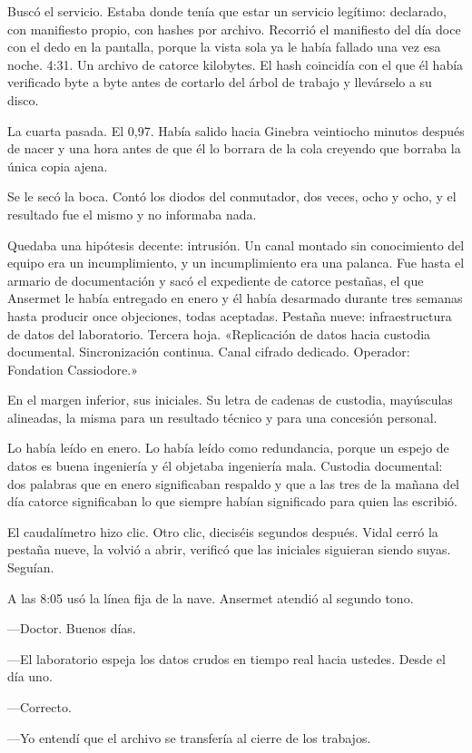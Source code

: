 Buscó el servicio. Estaba donde tenía que estar un servicio legítimo: declarado, con manifiesto propio, con hashes por archivo. Recorrió el manifiesto del día doce con el dedo en la pantalla, porque la vista sola ya le había fallado una vez esa noche. 4:31. Un archivo de catorce kilobytes. El hash coincidía con el que él había verificado byte a byte antes de cortarlo del árbol de trabajo y llevárselo a su disco.

La cuarta pasada. El 0,97. Había salido hacia Ginebra veintiocho minutos después de nacer y una hora antes de que él lo borrara de la cola creyendo que borraba la única copia ajena.

Se le secó la boca. Contó los diodos del conmutador, dos veces, ocho y ocho, y el resultado fue el mismo y no informaba nada.

Quedaba una hipótesis decente: intrusión. Un canal montado sin conocimiento del equipo era un incumplimiento, y un incumplimiento era una palanca. Fue hasta el armario de documentación y sacó el expediente de catorce pestañas, el que Ansermet le había entregado en enero y él había desarmado durante tres semanas hasta producir once objeciones, todas aceptadas. Pestaña nueve: infraestructura de datos del laboratorio. Tercera hoja. «Replicación de datos hacia custodia documental. Sincronización continua. Canal cifrado dedicado. Operador: Fondation Cassiodore.»

En el margen inferior, sus iniciales. Su letra de cadenas de custodia, mayúsculas alineadas, la misma para un resultado técnico y para una concesión personal.

Lo había leído en enero. Lo había leído como redundancia, porque un espejo de datos es buena ingeniería y él objetaba ingeniería mala. Custodia documental: dos palabras que en enero significaban respaldo y que a las tres de la mañana del día catorce significaban lo que siempre habían significado para quien las escribió.

El caudalímetro hizo clic. Otro clic, dieciséis segundos después. Vidal cerró la pestaña nueve, la volvió a abrir, verificó que las iniciales siguieran siendo suyas. Seguían.

A las 8:05 usó la línea fija de la nave. Ansermet atendió al segundo tono.

---Doctor. Buenos días.

---El laboratorio espeja los datos crudos en tiempo real hacia ustedes. Desde el día uno.

---Correcto.

---Yo entendí que el archivo se transfería al cierre de los trabajos.

